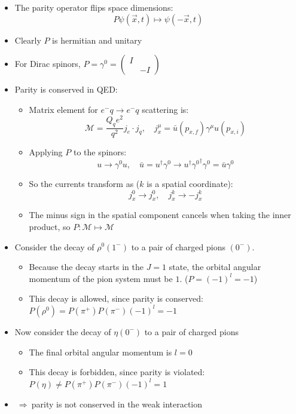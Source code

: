 \documentclass[11pt]{article}
\newcommand{\x}{\vec{x}}
\newcommand{\ubar}{\bar{u}}
\newcommand{\Mme}{\mathcal{M}}
\newcommand{\el}{\ensuremath{e^{-}}\xspace}
\newcommand{\thus}{\ensuremath{~\Rightarrow~}}
\begin{document}
\begin{itemize}
  \item The parity operator flips space dimensions:
  \begin{equation}
    P \psi(\x,t)\mapsto \psi(-\x,t)
  \end{equation}
  \item Clearly $P$ is hermitian and unitary
  \item For Dirac spinors, $P = \gamma^0 = \begin{pmatrix} I & \\ & -I \end{pmatrix}$
  \item Parity is conserved in QED:
  \begin{itemize}
    \item Matrix element for $\el q \rightarrow \el q$ scattering is:
    \begin{equation}
      \Mme = \frac{Q_qe^2}{q^2}j_e \cdot j_q, \quad j_x^\mu = \ubar(p_{x,f})\gamma^\mu u(p_{x,i})
    \end{equation}
    \item Applying $P$ to the spinors:
    \begin{equation}
      u \rightarrow \gamma^0 u, \quad \ubar = u^\dag\gamma^0 \rightarrow u^\dag {\gamma^0}^\dag \gamma^0 = \ubar \gamma^0
    \end{equation}
    \item So the currents transform as ($k$ is a spatial coordinate):
    \begin{equation}
      j_x^0 \rightarrow j_x^0, \quad j_x^k \rightarrow -j_x^k
    \end{equation}
    \item The minus sign in the spatial component cancels when taking the inner product, so $P:\Mme \mapsto \Mme$
  \end{itemize}
  \item Consider the decay of $\rho^0(1^-)$ to a pair of charged pions $(0^-)$. 
  \begin{itemize}
    \item Because the decay starts in the $J=1$ state, the orbital angular momentum of the pion system must be $1$. ($P = (-1)^l = -1$)
    \item This decay is allowed, since parity is conserved: $P(\rho^0) = P(\pi^+)P(\pi^-)(-1)^l = -1$
  \end{itemize}
  \item Now consider the decay of $\eta(0^-)$ to a pair of charged pions
  \begin{itemize}
    \item The final orbital angular momentum is $l=0$
    \item This decay is forbidden, since parity is violated: $P(\eta) \neq P(\pi^+)P(\pi^-)(-1)^l = 1$
  \end{itemize}
  \item \thus parity is not conserved in the weak interaction
\end{itemize}
\end{document}
